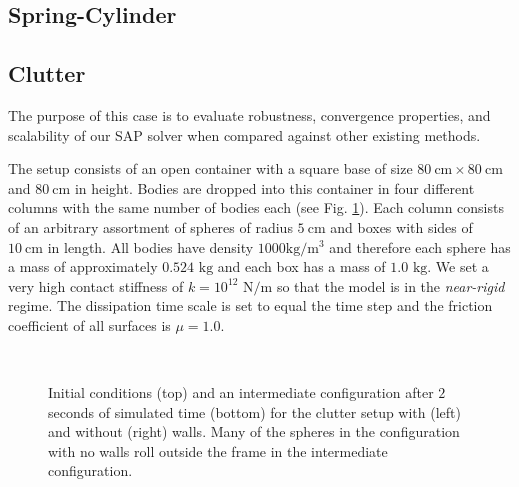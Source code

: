 \subsection{Spring-Cylinder}
\label{sec:spring_cylinder}


\subsection{Clutter}
\label{sec:clutter}

The purpose of this case is to evaluate robustness, convergence properties, and
scalability of our SAP solver when compared against other existing methods.

The setup consists of an open container with a square base of size
$80~\text{cm}\times80~\text{cm}$ and $80~\text{cm}$ in height. Bodies are
dropped into this container in four different columns with the same number of
bodies each (see Fig. \ref{fig:clutter_snapshots}). Each column consists of an
arbitrary assortment of spheres of radius $5~\text{cm}$ and boxes with sides of
$10~\text{cm}$ in length. All bodies have density $1000\text{
kg}/\text{m}^3$ and therefore each sphere has a mass of approximately
$0.524\text{ kg}$ and each box has a mass of $1.0\text{ kg}$. We set a very high
contact stiffness of $k=10^{12}\text{ N}/\text{m}$ so that the model is in the
\emph{near-rigid} regime. The dissipation time scale is set to equal the time
step and the friction coefficient of all surfaces is $\mu=1.0$.
\begin{figure}[t]
    \centering
    \\
    \vspace{0.1cm}
    \caption{Initial conditions (top) and an intermediate configuration after $2$ seconds of
    simulated time (bottom) for the clutter setup with (left) and without
    (right) walls. Many of the spheres in the configuration with no walls
	roll outside the frame in the intermediate configuration.}
    \label{fig:clutter_snapshots}
\end{figure}

